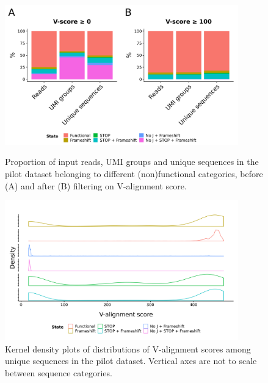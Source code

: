 \begin{figure}
\centering
\includegraphics[width = 0.9\textwidth]{_Figures/png/pilot-functional-prop}
\begin{subfigure}{0em}
\label{fig:igseq-pilot-functional-prop-a}
\end{subfigure}
\begin{subfigure}{0em}
\label{fig:igseq-pilot-functional-prop-b}
\end{subfigure}
\caption{Proportion of input reads, UMI groups and unique sequences in the pilot \igseq dataset belonging to different (non)functional categories, before (A) and after (B) filtering on V-alignment score.}
\label{fig:igseq-pilot-functional-prop}
\end{figure}

\begin{figure}
\centering
\includegraphics[width = 0.9\textwidth]{_Figures/png/pilot-functional-vscores}
\caption{Kernel density plots of distributions of V-alignment scores among unique sequences in the pilot \igseq dataset. Vertical axes are not to scale between sequence categories.}
\label{fig:igseq-pilot-functional-vscores}
\end{figure}

